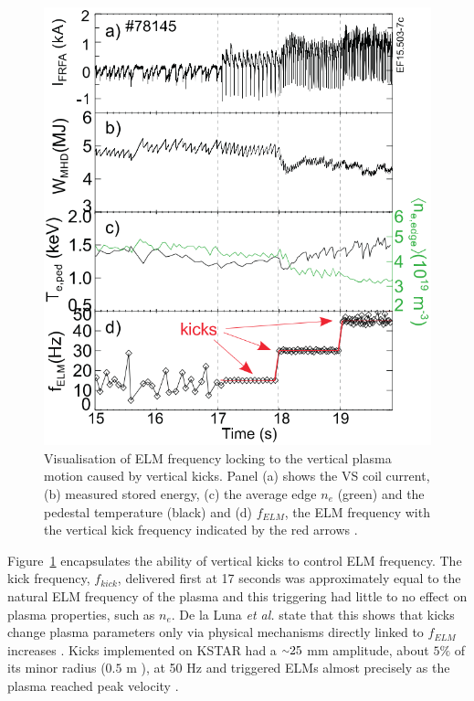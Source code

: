\documentclass[11pt, twocolumn]{article}  %
\providecommand{\squiggle}{\raise.17ex\hbox{$\scriptstyle\sim$}} %
\begin{document}
\begin{figure}
\includegraphics[scale=0.433]{Figures/VKdata.PNG}
\centering
\caption{Visualisation of ELM frequency locking to the vertical plasma motion caused by vertical kicks. Panel (a) shows the VS coil current, (b) measured stored energy, (c) the average edge $n_e$ (green) and the pedestal temperature (black) and (d) $f_{ELM}$, the ELM frequency with the vertical kick frequency indicated by the red arrows \cite{DelaLuna2016}.}\label{fig:VKdata}
\end{figure}

Figure~\ref{fig:VKdata} encapsulates the ability of vertical kicks to control ELM frequency. The kick frequency, $f_{kick}$, delivered first at 17 seconds was approximately equal to the natural ELM frequency of the plasma and this triggering had little to no effect on plasma properties, such as $n_e$. De la Luna \textit{et al.} state that this shows that kicks change plasma parameters only via physical mechanisms directly linked to $f_{ELM}$ increases \cite{DelaLuna2016}. Kicks implemented on KSTAR had a $\squiggle 25$ mm amplitude, about $5\%$ of its minor radius ($0.5$ m \cite{Choi1998}), at 50 Hz and triggered ELMs almost precisely as the plasma reached peak velocity \cite{Kim2012}.
\end{document}
